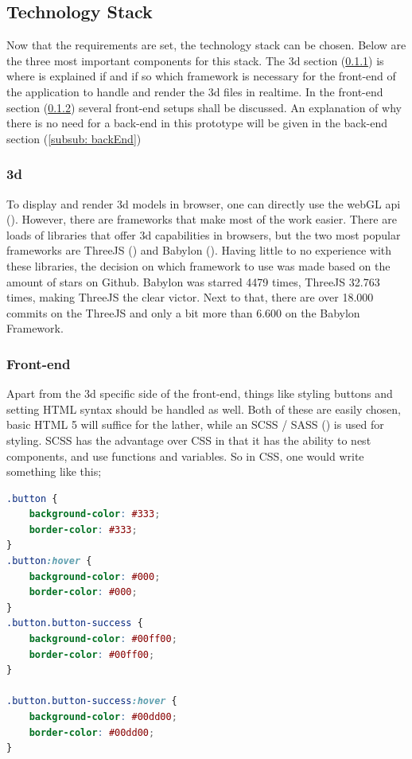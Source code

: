 \subsection{Technology Stack}
Now that the requirements are set, the technology stack can be chosen. Below are the three most important components for this stack. The 3d section (\ref{subsub: 3d}) is where is explained if and if so which framework is necessary for the front-end of the application to handle and render the 3d files in realtime. In the front-end section (\ref{subsub: frontEnd}) several front-end setups shall be discussed. An explanation of why there is no need for a back-end in this prototype will be given in the back-end section (\ref{subsub: backEnd})

\subsubsection{3d}
\label{subsub: 3d}
To display and render 3d models in browser, one can directly use the webGL api (\cite{webGL}). However, there are frameworks that make most of the work easier. There are loads of libraries that offer 3d capabilities in browsers, but the two most popular frameworks are ThreeJS (\cite{threejs}) and Babylon (\cite{babylon}). Having little to no experience with these libraries, the decision on which framework to use was made based on the amount of stars on Github. Babylon was starred 4479 times, ThreeJS 32.763 times, making ThreeJS the clear victor. Next to that, there are over 18.000 commits on the ThreeJS and only a bit more than 6.600 on the Babylon Framework.

\subsubsection{Front-end}
\label{subsub: frontEnd}
Apart from the 3d specific side of the front-end, things like styling buttons and setting HTML syntax should be handled as well. Both of these are easily chosen, basic HTML 5 will suffice for the lather, while an SCSS / SASS (\cite{scss}) is used for styling. SCSS has the advantage over CSS in that it has the ability to nest components, and use functions and variables. So in CSS, one would write something like this;

\begin{lstlisting}[language=CSS]
.button {
	background-color: #333;
	border-color: #333;
}
.button:hover {
	background-color: #000;
	border-color: #000;
}
.button.button-success {
	background-color: #00ff00;
	border-color: #00ff00;
}

.button.button-success:hover {
	background-color: #00dd00;
	border-color: #00dd00;
}
\end{lstlisting}

